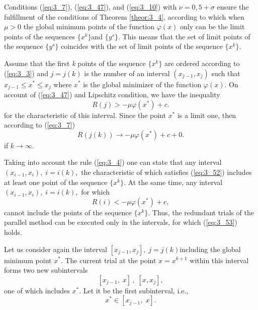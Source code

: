	Conditions  (\ref{eq:3_7}),  (\ref{eq:3_47}), and  (\ref{eq:3_10}) with $\nu =0,5+\sigma $ ensure the fulfillment of the conditions of Theorem \ref{theor:3_4}, according to which when $\mu >0$ the global minimum points of the function $\varphi (x)$ only can be the limit points of the sequences $\{ x^k \} $and\textit{ $\{ y^{s} \} $}. This means that the set of limit points of the sequence \textit{$\{ y^{s} \} $} coincides with the set of limit points of the sequence $\{ x^k \} $. 
	
	Assume that the first \textit{k} points of the sequence $\{ x^k \} $ are ordered according to  (\ref{eq:3_3}) and $j=j(k)$ is the number of an interval $(x_{j-1} ,x_j )$ such that $x_{j-1} \le x^{*} \le x_{j} $ where $x^{*} $ is the global minimizer of the function $\varphi (x)$. On account of  (\ref{eq:3_47}) and Lipschitz condition, we have the inequality 
	\begin{equation}
	\label{eq:3_52}
	R(j)>-\mu \varphi (x^{*} )+c.
	\end{equation}
	for the characteristic of this interval. Since the point $x^{*} $ is a limit one, then according to  (\ref{eq:3_7}) 
	\begin{equation*}
	R(j(k))\to -\mu \varphi (x^{*} )+c+0.
	\end{equation*}
	if $k\to \infty $.
	
	Taking into account the rule  (\ref{eq:3_4}) one can state that any interval $(x_{i-1} ,x_{i} ),\; i=i(k),$ the characteristic of which satisfies  (\ref{eq:3_52}) includes at least one point of the sequence $\{ x^{k} \} $. At the same time, any interval $(x_{i-1} ,x_{i} ),\; i=i(k),$ for which 
	\begin{equation}
	\label{eq:3_53}
	R(i)<-\mu \varphi (x^{*} )+c,
	\end{equation}
	cannot include the points of the sequence $\{ x^{k} \} $. Thus, the redundant trials of the parallel method can be executed only in the intervals, for which  (\ref{eq:3_53}) holds.
	
	Let us consider again the interval \textit{$[x_{j-1} ,x_{j} ],\; j=j(k)$}including the global minimum point $x^{*} $. The current trial at the point $x=x^{k+1} $ within this interval forms two new subintervals
	\begin{equation}
	\label{eq:3_54}
	[x_{j-1} ,\; x]\, ,\; [x,x_{j} ],
	\end{equation}
	one of which includes $x^{*} $. Let it be the first subinterval, i.e.,
	\begin{equation}
	\label{eq:3_55}
	x^{*} \in [x_{j-1} ,\; x].
	\end{equation}
	
